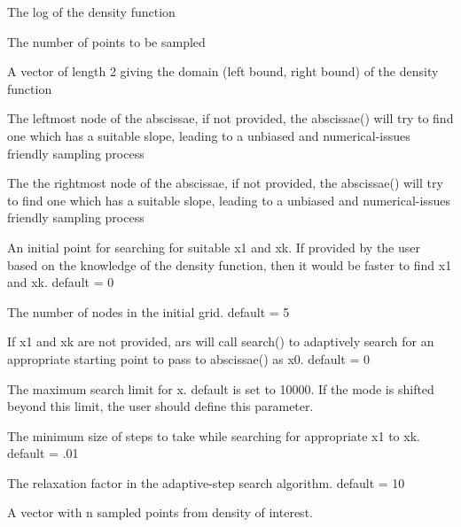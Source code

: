 \documentclass[a4paper]{book}
\begin{document}
\begin{Arguments}
\begin{ldescription}
\item[\code{h}] The log of the density function

\item[\code{n}] The number of points to be sampled

\item[\code{domain}] A vector of length 2 giving the domain (left bound, right bound) of the density function

\item[\code{x1}] The leftmost node of the abscissae, if not provided, the abscissae() will try to find one which has a suitable slope, leading to a unbiased and numerical-issues friendly sampling process

\item[\code{xk}] The the rightmost node of the abscissae, if not provided, the abscissae() will try to find one which has a suitable slope, leading to a unbiased and numerical-issues friendly sampling process

\item[\code{x0}] An initial point for searching for suitable x1 and xk. If provided by the user based on the knowledge of the density function, then it would be faster to find x1 and xk. default = 0

\item[\code{nmesh}] The number of nodes in the initial grid. default = 5

\item[\code{x\_start}] If x1 and xk are not provided, ars will call search() to adaptively search for an appropriate starting point to pass to abscissae() as x0. default = 0

\item[\code{max\_x}] The maximum search limit for x. default is set to 10000. If the mode is shifted beyond this limit, the user should define this parameter.

\item[\code{min\_step}] The minimum size of steps to take while searching for appropriate x1 to xk. default = .01

\item[\code{relax\_factor}] The relaxation factor in the adaptive-step search algorithm. default = 10
\end{ldescription}
\end{Arguments}
%
\begin{Value}
A vector with n sampled points from density of interest.
\end{Value}
\end{document}
